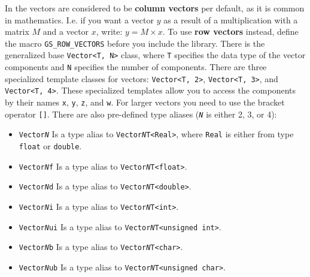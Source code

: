 \documentclass{article}
\begin{document}
In the \gausslib vectors are considered to be \textbf{column vectors} per default, as it is common in mathematics.
I.e. if you want a vector $y$ as a result of a multiplication with a matrix $M$ and a vector $x$,
write: $y = M \times x$.
To use \textbf{row vectors} instead, define the macro \texttt{GS\_ROW\_VECTORS} before you include the library.
There is the generalized base \mbox{\texttt{Vector<T, N>}} class, where \texttt{T} specifies the data type of the
vector components and \texttt{N} specifies the number of components.
There are three specialized template classes for vectors: \texttt{Vector<T, 2>}, \texttt{Vector<T, 3>},
and \texttt{Vector<T, 4>}. These specialized templates allow you to access the components by their names
\texttt{x}, \texttt{y}, \texttt{z}, and \texttt{w}. For larger vectors you need to use the bracket operator \texttt{[]}.
There are also pre-defined type aliases (\texttt{\textit{N}} is either 2, 3, or 4):
\begin{itemize}
	\item \texttt{Vector\textit{N}} Is a type alias to \texttt{Vector\textit{N}T<Real>}, where \texttt{Real} is either
		from type \texttt{float} or \texttt{double}.
	\item \texttt{Vector\textit{N}f} Is a type alias to \texttt{Vector\textit{N}T<float>}.
	\item \texttt{Vector\textit{N}d} Is a type alias to \texttt{Vector\textit{N}T<double>}.
	\item \texttt{Vector\textit{N}i} Is a type alias to \texttt{Vector\textit{N}T<int>}.
	\item \texttt{Vector\textit{N}ui} Is a type alias to \texttt{Vector\textit{N}T<unsigned int>}.
	\item \texttt{Vector\textit{N}b} Is a type alias to \texttt{Vector\textit{N}T<char>}.
	\item \texttt{Vector\textit{N}ub} Is a type alias to \texttt{Vector\textit{N}T<unsigned char>}.
\end{itemize}
\end{document}
